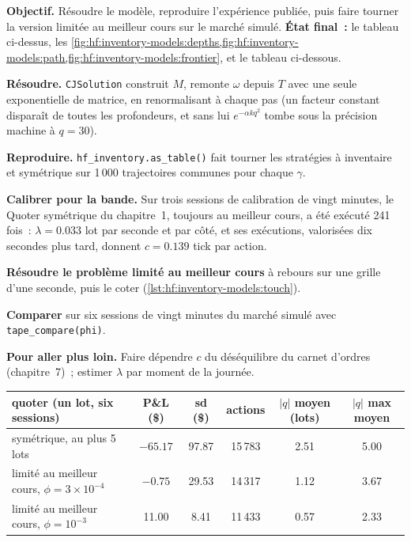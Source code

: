 \begin{tutorial}
\textbf{Objectif.} Résoudre le modèle, reproduire l'expérience publiée, puis faire tourner la version limitée au meilleur cours sur le marché simulé. \textbf{État final~:} le
tableau ci-dessus, les \cref{fig:hf:inventory-models:depths,fig:hf:inventory-models:path,fig:hf:inventory-models:frontier}, et le tableau ci-dessous.
\begin{tutsteps}
\item \textbf{Résoudre.} \texttt{CJSolution} construit $M$, remonte $\omega$ depuis $T$ avec une seule exponentielle de matrice, en renormalisant à chaque pas (un
facteur constant disparaît de toutes les profondeurs, et sans lui $e^{-\alpha kq^2}$ tombe sous la précision machine à $q=30$).
\label{lst:hf:inventory-models:cj}
\item \textbf{Reproduire.} \texttt{hf\_inventory.as\_table()} fait tourner les stratégies à inventaire et symétrique sur 1\,000 trajectoires communes pour chaque $\gamma$.
\item \textbf{Calibrer pour la bande.} Sur trois sessions de calibration de vingt minutes, le Quoter symétrique du chapitre~1, toujours au meilleur cours, a été
exécuté 241 fois~: $\lambda=0.033$ lot par seconde et par côté, et ses exécutions, valorisées dix secondes plus tard, donnent $c=0.139$ tick par action.
\item \textbf{Résoudre le problème limité au meilleur cours} à rebours sur une grille d'une seconde, puis le coter (\cref{lst:hf:inventory-models:touch}).
\label{lst:hf:inventory-models:touch}
\item \textbf{Comparer} sur six sessions de vingt minutes du marché simulé avec \texttt{tape\_compare(phi)}.
\end{tutsteps}
\textbf{Pour aller plus loin.} Faire dépendre $c$ du déséquilibre du carnet d'ordres (chapitre~7)~; estimer $\lambda$ par moment de la journée.
\end{tutorial}

\begin{center}
\small
\begin{tabular}{@{}lccccc@{}}
\toprule
quoter (un lot, six sessions) & P\&L (\$) & sd (\$) & actions & $|q|$ moyen (lots) & $|q|$ max moyen\\
\midrule
symétrique, au plus 5 lots & $-65.17$ & 97.87 & 15\,783 & 2.51 & 5.00\\
limité au meilleur cours, $\phi=3\times10^{-4}$ & $-0.75$ & 29.53 & 14\,317 & 1.12 & 3.67\\
limité au meilleur cours, $\phi=10^{-3}$ & 11.00 & 8.41 & 11\,433 & 0.57 & 2.33\\
\bottomrule
\end{tabular}
\end{center}


